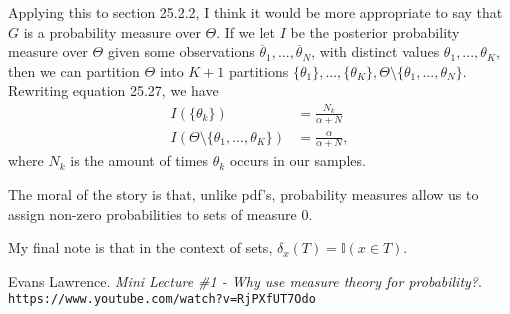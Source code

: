 \documentclass[a4paper,11pt]{article}
\begin{document}
	Applying this to section 25.2.2, I think it would be more appropriate to say that $G$ is a
	probability measure over $\Theta$. If we let $I$ be the posterior probability measure over 
	$\Theta$ given some observations $\overline{\theta}_1, ..., \overline{\theta}_N$, with
	distinct values $\theta_1, ..., \theta_K$, then we can partition $\Theta$ into $K + 1$ partitions
	$\{ \theta_1 \}, ..., \{ \theta_K \}, \Theta \setminus \{ \theta_1, ..., \theta_N \}$.
	Rewriting equation 25.27, we have
	\begin{align*}
		I( \{ \theta_k \} ) &= \frac{N_k}{ \alpha + N } \\
		I( \Theta \setminus \{ \theta_1, ..., \theta_K \}) &= \frac\alpha{ \alpha + N },
	\end{align*}
	where $N_k$ is the amount of times $\theta_k$ occurs in our samples.

	The moral of the story is that, unlike pdf's, probability measures allow us to assign non-zero
	probabilities to sets of measure 0.

	My final note is that in the context of sets, $\delta_x(T) = \mathbb{I}(x \in T)$.

	\begin{thebibliography}{9}
	Evans Lawrence.
	\textit{Mini Lecture \#1 - Why use measure theory for probability?}.
	\\\texttt{https://www.youtube.com/watch?v=RjPXfUT7Odo}
	\end{thebibliography}
\end{document}
